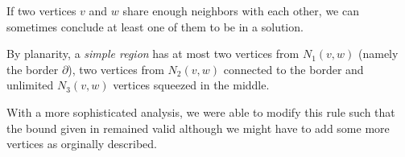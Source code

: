 If two vertices $v$ and $w$ share enough neighbors with each other, we can sometimes conclude at least one of them to be in a solution. 

By planarity, a \textit{simple region} has at most two vertices from $N_1(v,w)$ (namely the border $\partial$), two vertices from $N_2(v,w)$ connected to the border and unlimited $N_3(v,w)$ vertices squeezed in the middle.

With a more sophisticated analysis, we were able to modify this rule such that the bound given in \cite{Garnero2018} remained valid although we might have to add some more vertices as orginally described.




